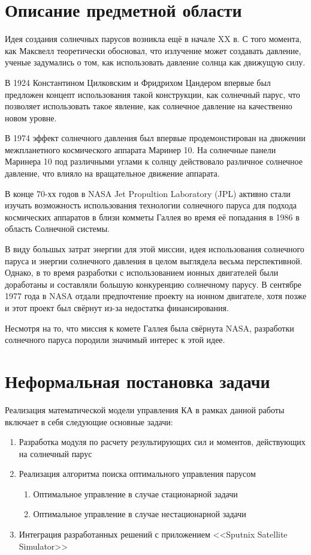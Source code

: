 \section{Описание предметной области}
\noindent\indent Идея создания солнечных парусов возникла ещё в начале XX в.
С того момента, как Максвелл теоретически обосновал, что излучение может создавать давление,
ученые задумались о том, как использовать давление солнца как движущую силу.\par
В 1924 Константином Цилковским и Фридрихом Цандером впервые был предложен концепт
использования такой конструкции, как солнечный парус, что позволяет использовать
такое явление, как солнечное давление на качественно новом уровне.\par
В 1974 эффект солнечного давления был впервые продемонстирован на движении межпланетного
космического аппарата Маринер 10. На солнечные панели Маринера 10 под различными углами к солнцу
действовало различное солнечное давление, что влияло на вращательное движение аппарата.\par
В конце 70-хх годов в NASA Jet Propultion Laboratory (JPL) активно стали изучать
возможность использования технологии солнечного паруса для подхода космических аппаратов
в близи комметы Галлея во время её попадания в 1986 в область Солнечной системы.\par
В виду большых затрат энергии для этой миссии, идея использования солнечного паруса
и энергии солнечного давления в целом выглядела весьма перспективной.
Однако, в то время разработки с использованием ионных двигателей были доработаны и составляли
большую конкуренцию солнечному парусу. В сентябре 1977 года в NASA отдали предпочтение
проекту на ионном двигателе, хотя позже и этот проект был свёрнут из-за недостатка финансирования.\par
Несмотря на то, что миссия к комете Галлея была свёрнута NASA, разработки солнечного паруса
породили значимый интерес к этой идее.
\section{Неформальная постановка задачи}
\noindent\indent Реализация математической модели управления КА в рамках данной
работы включает в себя следующие основные задачи:
\begin{enumerate}[label=\arabic*.]
  \item Разработка модуля по расчету результирующих сил и моментов, действующих
  на солнечный парус
  \item Реализация алгоритма поиска оптимального управления парусом
  \begin{enumerate}[label*=\arabic*.]
    \item Оптимальное управление в случае стационарной задачи
    \item Оптимальное управление в случае нестационарной задачи
  \end{enumerate}
  \item Интеграция разработанных решений с приложением <<Sputnix Satellite Simulator>>
\end{enumerate}
